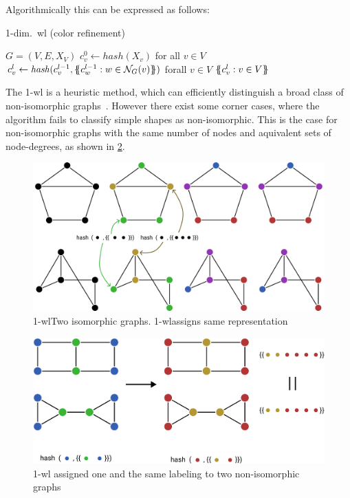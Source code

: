 Algorithmically this can be expressed as follows:
\begin{algorithm}[H]
    \caption{1-dim.\ \ac{wl} (color refinement)}
    \begin{algorithmic}[1]
        \Require $G = (V,E,X_{V})$
        \State $c_{v}^{0} \gets \mathit{hash}(X_{v})$ for all $v \in V$
        \Repeat
        \State $c_{v}^{l} \gets \mathit{hash}(c_{v}^{l-1}, \ldblbrace c_{w}^{l-1}: w \in \mathcal N_{G}(v)\rdblbrace)$ forall $v \in V$
        \State \Return $\ldblbrace c_{v}^l : v \in V \rdblbrace$
    \end{algorithmic}
\end{algorithm}

The 1-\ac{wl} is a heuristic method, which can efficiently distinguish a broad class of non-isomorphic
graphs~\cite{Babai1979}.
However there exist some corner cases, where the algorithm fails to classify
simple shapes as non-isomorphic. This is the case for non-isomorphic graphs with the same number of nodes and aquivalent sets of node-degrees, as shown in \cref*{fig:related:1-wl-indistinguishable}.

\begin{figure}[H]
    \centering
    \includegraphics[width= 0.90\linewidth]{gfx/related-work/1wl-isomorph}
    \caption{1-\ac{wl}Two isomorphic graphs. 1-\ac{wl}assigns same
        representation}\label{fig:related:1-wl-indistinguishable}
\end{figure}

\begin{figure}[H]
    \centering
    \includegraphics[width= 0.90\linewidth]{gfx/related-work/1wl-indistinguishable}
    \caption{1-\ac{wl} assigned one and the same labeling to two non-isomorphic graphs~\cite{Liu2022}}\label{fig:related:1-wl-indistinguishable}
\end{figure}


